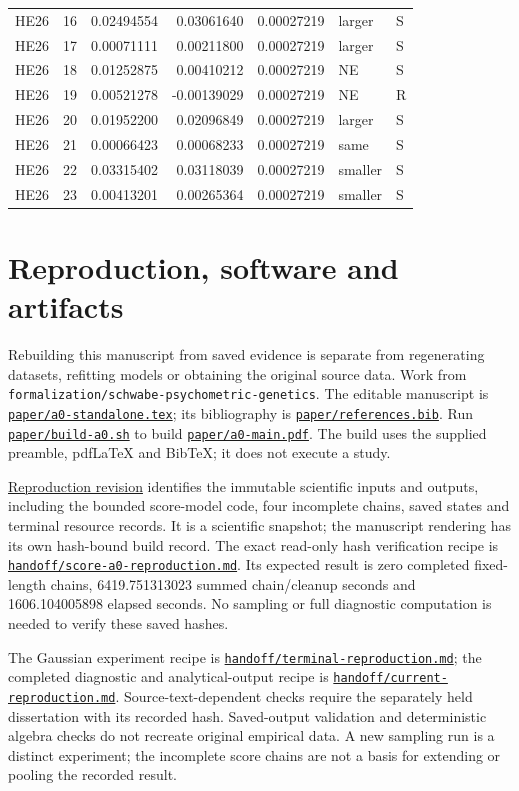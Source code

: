 \documentclass[11pt]{article}
\newcommand{\file}[1]{\href{https://github.com/alectionary/vibe-math/blob/master/formalization/schwabe-psychometric-genetics/#1}{\nolinkurl{#1}}}
\begin{document}
{\begin{longtable}{llrrrll}
HE26 & 16 & 0.02494554 & 0.03061640 & 0.00027219 & larger & S\\
HE26 & 17 & 0.00071111 & 0.00211800 & 0.00027219 & larger & S\\
HE26 & 18 & 0.01252875 & 0.00410212 & 0.00027219 & NE & S\\
HE26 & 19 & 0.00521278 & -0.00139029 & 0.00027219 & NE & R\\
HE26 & 20 & 0.01952200 & 0.02096849 & 0.00027219 & larger & S\\
HE26 & 21 & 0.00066423 & 0.00068233 & 0.00027219 & same & S\\
HE26 & 22 & 0.03315402 & 0.03118039 & 0.00027219 & smaller & S\\
HE26 & 23 & 0.00413201 & 0.00265364 & 0.00027219 & smaller & S\\
\bottomrule\end{longtable}}
\section{Reproduction, software and artifacts}\label{sec:reproduction}
Rebuilding this manuscript from saved evidence is separate from regenerating datasets, refitting models or obtaining the original source data. Work from \nolinkurl{formalization/schwabe-psychometric-genetics}. The editable manuscript is \file{paper/a0-standalone.tex}; its bibliography is \file{paper/references.bib}. Run \file{paper/build-a0.sh} to build \file{paper/a0-main.pdf}. The build uses the supplied preamble, pdfLaTeX and BibTeX; it does not execute a study.

\href{https://github.com/alectionary/vibe-math/commit/7ddf23f40124239a8f245de7c71540b0c80216bf}{Reproduction revision} identifies the immutable scientific inputs and outputs, including the bounded score-model code, four incomplete chains, saved states and terminal resource records. It is a scientific snapshot; the manuscript rendering has its own hash-bound build record. The exact read-only hash verification recipe is \file{handoff/score-a0-reproduction.md}. Its expected result is zero completed fixed-length chains, 6419.751313023 summed chain/cleanup seconds and 1606.104005898 elapsed seconds. No sampling or full diagnostic computation is needed to verify these saved hashes.

The Gaussian experiment recipe is \file{handoff/terminal-reproduction.md}; the completed diagnostic and analytical-output recipe is \file{handoff/current-reproduction.md}. Source-text-dependent checks require the separately held dissertation with its recorded hash. Saved-output validation and deterministic algebra checks do not recreate original empirical data. A new sampling run is a distinct experiment; the incomplete score chains are not a basis for extending or pooling the recorded result.
\end{document}

